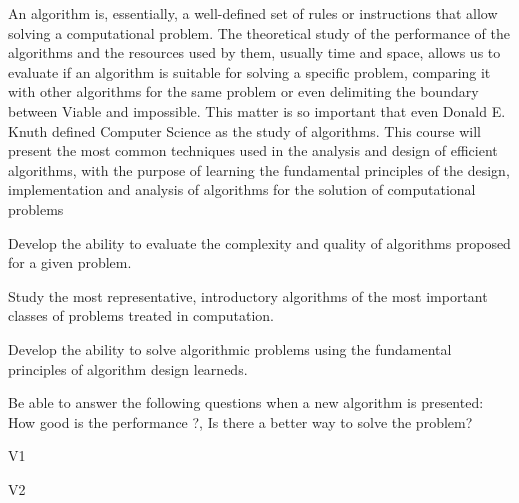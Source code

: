 \begin{syllabus}


\begin{justification}
An algorithm is, essentially, a well-defined set of rules or instructions that allow solving a computational problem.
The theoretical study of the performance of the algorithms and the resources used by them, usually time and space, allows us to evaluate if an algorithm is suitable for solving a specific problem, comparing it with other algorithms for the same problem or even delimiting the boundary between Viable and impossible.
This matter is so important that even Donald E. Knuth defined Computer Science as the study of algorithms.
This course will present the most common techniques used in the analysis and design of efficient algorithms,
with the purpose of learning the fundamental principles of the design, implementation and analysis of algorithms for the solution of computational problems
\end{justification}

\begin{goals} 
\item Develop the ability to evaluate the complexity and quality of algorithms proposed for a given problem.
\item Study the most representative, introductory algorithms of the most important classes of problems treated in computation.
\item Develop the ability to solve algorithmic problems using the fundamental principles of algorithm design learneds.
\item Be able to answer the following questions when a new algorithm is presented: How good is the performance ?, Is there a better way to solve the problem?
\end{goals}

\begin{outcomes}{V1}
    \item {} 
    \item {} 
\end{outcomes}

\begin{outcomes}{V2}
    \item {} 
    \item {} 
\end{outcomes}


\end{syllabus}
